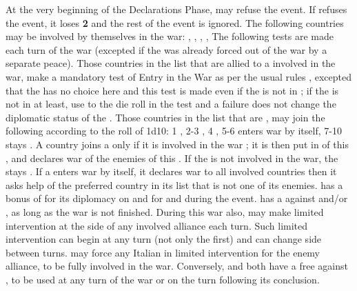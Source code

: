 \phdipl
{}
\bparag At the very beginning of the Declarations Phase, \FRA may refuse the
event.
\bparag If \FRA refuses the event, it loses {\bf 2} \STAB and the rest of the
event is ignored.
\bparag The following countries may be involved by themselves in the war:
\paysGenes, \paysMilan, \payspapaute, \paysSavoie, The following tests are
made each turn of the war (excepted if the \MIN was already forced out of the
war by a separate peace).
\bparag Those countries in the list that are allied to a \MAJ involved in the
war, make a mandatory test of Entry in the War as per the usual rules
, excepted that the \MAJ has no choice here
and this test is made even if the \MIN is not in \EG; if the \MIN is not in
\EG at least, use  to the die roll in the test and a failure does
not change the diplomatic status of the \MIN.
\bparag Those countries in the list that are \Neutral, may join the following
\MAJ according to the roll of 1d10: 1 \FRA, 2-3 \HAB, 4 \VEN, 5-6 enters war
by itself, 7-10 stays \Neutral. A country joins a \MAJ only if it is involved
in the war ; it is then put in \EG of this \MAJ, and declares war of the
enemies of this \MAJ. If the \MAJ is not involved in the war, the \MIN stays
\Neutral.
\bparag If a \MIN enters war by itself, it declares war to all involved
countries then it asks help of the preferred country in its list that is not
one of its enemies.
 \FRA has a bonus of  for its
diplomacy on \paysToscane and  for \payspapaute and \paysParme
during the event.
\bparag \VEN has a \CB against \FRA and/or \paysNaples, as long as the war is
not finished.
\bparag During this war also, \VEN may make limited intervention at the side
of any involved alliance each turn. Such limited intervention can begin at any
turn (not only the first) and \VEN can change side between turns. \VEN may
force any Italian \MIN in limited intervention for the enemy alliance, to be
fully involved in the war.
\bparag Conversely, \FRA and \HAB both have a free \CB against \VEN, to be
used at any turn of the war or on the turn following its conclusion.

